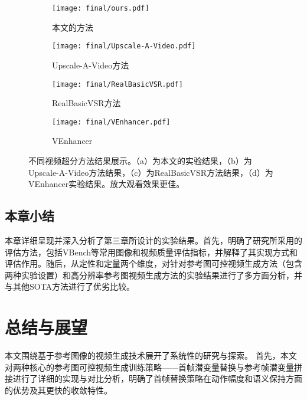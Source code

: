 \begin{figure}[H]
    \centering
    \begin{subfigure}[b]{0.9\textwidth}
        \texttt{[image: final/ours.pdf]}
        \caption{本文的方法}
        \label{fig:ours}
    \end{subfigure}

    \vspace{0.5em} %

    \begin{subfigure}[b]{0.3\textwidth}
        \texttt{[image: final/Upscale-A-Video.pdf]}
        \caption{Upscale-A-Video方法}
        \label{fig:upscale}
    \end{subfigure}
    \hfill
    \begin{subfigure}[b]{0.3\textwidth}
        \texttt{[image: final/RealBasicVSR.pdf]}
        \caption{RealBasicVSR方法}
        \label{fig:rbvsr}
    \end{subfigure}
    \hfill
    \begin{subfigure}[b]{0.3\textwidth}
        \texttt{[image: final/VEnhancer.pdf]}
        \caption{VEnhancer}
        \label{fig:venhancer方法}
    \end{subfigure}

    \caption{不同视频超分方法结果展示。（a）为本文的实验结果，（b）为Upscale-A-Video方法结果，（c）为RealBasicVSR方法结果，（d）为VEnhancer实验结果。放大观看效果更佳。}
    \label{fig:vsrcompare}
\end{figure}



\subsection{本章小结}
本章详细呈现并深入分析了第三章所设计的实验结果。首先，明确了研究所采用的评估方法，包括VBench等常用图像和视频质量评估指标，并解释了其实现方式和评估作用。随后，从定性和定量两个维度，对针对参考图可控视频生成方法（包含两种实验设置）和高分辨率参考图视频生成方法的实验结果进行了多方面分析，并与其他SOTA方法进行了优劣比较。

\cleardoublepage
\section{总结与展望}
本文围绕基于参考图像的视频生成技术展开了系统性的研究与探索。
首先，本文对两种核心的参考图可控视频生成训练策略——首帧潜变量替换与参考帧潜变量拼接进行了详细的实现与对比分析，明确了首帧替换策略在动作幅度和语义保持方面的优势及其更快的收敛特性。

